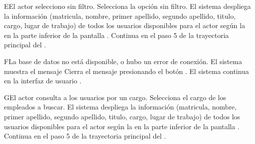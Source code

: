 
\begin{UCtrayectoriaA}{E}{El actor selecciono sin filtro.}
	\UCpaso[\UCactor] Selecciona la opción sin filtro.
	\UCpaso El sistema despliega la información (matricula,  nombre, primer apellido, segundo apellido, titulo, cargo, lugar de trabajo) de todos los usuarios disponibles para el actor según la   en la parte inferior de la pantalla .
	\UCpaso Continua en el paso 5 de la trayectoria principal del . 
\end{UCtrayectoriaA}

\begin{UCtrayectoriaA}{F}{La base de datos no está disponible, o hubo un error de conexión.}
	\UCpaso El sistema muestra el mensaje 
	\UCpaso[\UCactor] Cierra el mensaje presionando el botón .
	\UCpaso  El sistema continua en la interfaz de usuario .
\end{UCtrayectoriaA}

\begin{UCtrayectoriaA}{G}{El actor consulta a los usuarios por un cargo.}
	\UCpaso[\UCactor] Selecciona el cargo de los empleados a buscar.
	\UCpaso El sistema despliega la información (matricula,  nombre, primer apellido, segundo apellido, titulo, cargo, lugar de trabajo) de todos los usuarios disponibles para el actor según la   en la parte inferior de la pantalla .
	\UCpaso Continua en el paso 5 de la trayectoria principal del . 
\end{UCtrayectoriaA}





